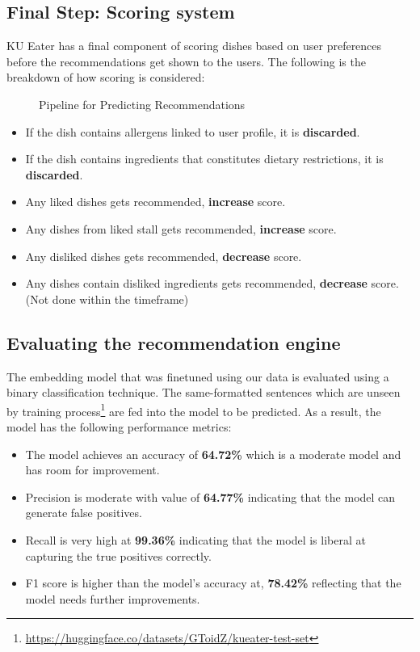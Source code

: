 \subsection{Final Step: Scoring system}
KU Eater has a final component of scoring dishes based on user preferences
before the recommendations get shown to the users. The following is the breakdown of
how scoring is considered:

\begin{figure}[h!]
    \centering
    
    \caption{Pipeline for Predicting Recommendations}
    \label{fig:pipeline-for-predicting-2}
\end{figure}

\begin{itemize}[leftmargin=80pt]
    \item If the dish contains allergens linked to user profile, it is \textbf{discarded}.
    \item If the dish contains ingredients that constitutes dietary restrictions, it is \textbf{discarded}.
    \item Any liked dishes gets recommended, \textbf{increase} score.
    \item Any dishes from liked stall gets recommended, \textbf{increase} score.
    \item Any disliked dishes gets recommended, \textbf{decrease} score.
    \item Any dishes contain disliked ingredients gets recommended, \textbf{decrease} score. (Not done within the timeframe)
\end{itemize}

\subsection{Evaluating the recommendation engine}
The embedding model that was finetuned using our data is evaluated using a binary classification technique.
The same-formatted sentences which are unseen by training process\footnote{\url{https://huggingface.co/datasets/GToidZ/kueater-test-set}}
are fed into the model to be predicted. As a result, the model has the following performance metrics:

\begin{itemize}[leftmargin=80pt]
    \item The model achieves an accuracy of \textbf{64.72\%} which is a moderate model and has room for improvement.
    \item Precision is moderate with value of \textbf{64.77\%} indicating that the model can generate false positives.
    \item Recall is very high at \textbf{99.36\%} indicating that the model is liberal at capturing the true positives correctly.
    \item F1 score is higher than the model's accuracy at, \textbf{78.42\%} reflecting that the model needs further improvements.
\end{itemize}

